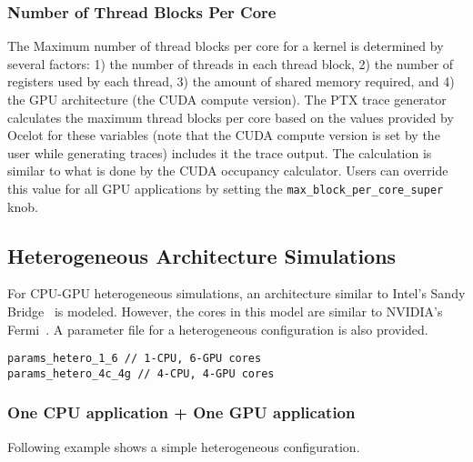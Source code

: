 \subsubsection{Number of Thread Blocks Per Core}

The Maximum number of thread blocks per core for a kernel is determined by
several factors: 1) the number of threads in each thread block, 2) the number
of registers used by each thread, 3) the amount of shared memory required, and
4) the GPU architecture (the CUDA compute version). The PTX trace generator
calculates the maximum thread blocks per core based on the values provided by
Ocelot for these variables (note that the CUDA compute version is set by the
    user while generating traces) includes it the trace output.  The
calculation is similar to what is done by the CUDA occupancy calculator. Users
can override this value for all GPU applications by setting the
\Verb+max_block_per_core_super+ knob.




\subsection{Heterogeneous Architecture Simulations}

For CPU-GPU heterogeneous simulations, an architecture similar to Intel's Sandy
Bridge~\cite{sandybridge} is modeled. However, the \gpu cores in this model are
similar to NVIDIA's Fermi~\cite{fermi}. A parameter file for a heterogeneous
configuration is also provided.

\begin{Verbatim}
params_hetero_1_6 // 1-CPU, 6-GPU cores
params_hetero_4c_4g // 4-CPU, 4-GPU cores
\end{Verbatim}


\subsubsection{One CPU application + One GPU application}

Following example shows a simple heterogeneous configuration.

